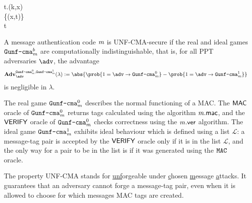 \begin{security}
\begin{codebox}
\begin{center}
\begin{pchstack}
\begin{pcvstack}
{            t\gets \m.\mac(k,x)\\
            \gets{}\cup\{(x,t)\}\\
            \pcreturn t}
          \pcvspace
        \end{pcvstack}
      \end{pchstack}
    \end{center}
  \end{codebox}
  \vspace{5mm}
  A message authentication code $\mathit{{m}}$ is UNF-CMA-secure if the real and ideal games $\text{\texttt{Gunf\text{-}cma}}^b_{\mathit{{m}}}$ are computationally indistinguishable, that is, for all PPT adversaries $\adv$, the advantage
  \[\mathbf{Adv}_{\adv}^{
    \M{Gunf\text{-}cma}^0_\m,
    \M{Gunf\text{-}cma}^1_\m}
    (\lambda):=\abs{\prob{1=\adv\circ \M{Gunf\text{-}cma}^0_\m}-\prob{1=\adv\circ \M{Gunf\text{-}cma}^1_\m}}\]
  is negligible in $\lambda$.
\end{security}

\begin{remark}
  The real game $\text{\texttt{Gunf\text{-}cma}}^0_{\mathit{{m}}}$ describes the normal functioning of a MAC. The $\mathsf{MAC}$ oracle of $\text{\texttt{Gunf\text{-}cma}}^0_{\mathit{{m}}}$ returns tags calculated using the algorithm $\mathit{{m}}.\mathsf{mac}$, and the $\mathsf{VERIFY}$ oracle of $\text{\texttt{Gunf\text{-}cma}}^0_{\mathit{{m}}}$  checks correctness using the $\mathit{{m}}.\mathsf{ver}$ algorithm. The ideal game $\text{\texttt{Gunf\text{-}cma}}^1_{\mathit{{m}}}$ exhibits ideal behaviour which is defined using a list $\mathcal{L}$: a message-tag pair is accepted by the $\mathsf{VERIFY}$ oracle only if it is in the list $\mathcal{L}$, and the only way for a pair to be in the list is if it was generated using the $\text{\texttt{MAC}}$ oracle.
\end{remark}

\begin{remark}
  The property UNF-CMA stands for \underline{unf}orgeable under \underline{c}hosen \underline{m}essage \underline{a}ttacks. It guarantees that an adversary cannot forge a message-tag pair, even when it is allowed to choose for which messages MAC tags are created.
\end{remark}

